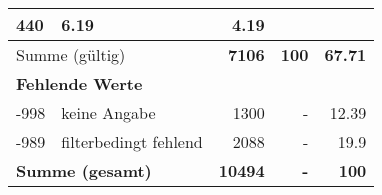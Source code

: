 \begin{longtable}{lXrrr}
       \num{440} &
       \num[round-mode=places,round-precision=2]{6.19} &
         \num[round-mode=places,round-precision=2]{4.19} \\
     \midrule
     \multicolumn{2}{l}{Summe (gültig)} &
       \textbf{\num{7106}} &
     \textbf{\num{100}} &
       \textbf{\num[round-mode=places,round-precision=2]{67.71}} \\
     \multicolumn{5}{l}{\textbf{Fehlende Werte}}\\
       -998 &
       keine Angabe &
         \num{1300} &
        - &
         \num[round-mode=places,round-precision=2]{12.39} \\
       -989 &
       filterbedingt fehlend &
         \num{2088} &
        - &
         \num[round-mode=places,round-precision=2]{19.9} \\
     \midrule
     \multicolumn{2}{l}{\textbf{Summe (gesamt)}} &
          \textbf{\num{10494}} &
        \textbf{-} &
        \textbf{\num{100}} \\
     \bottomrule
     \end{longtable}
     
